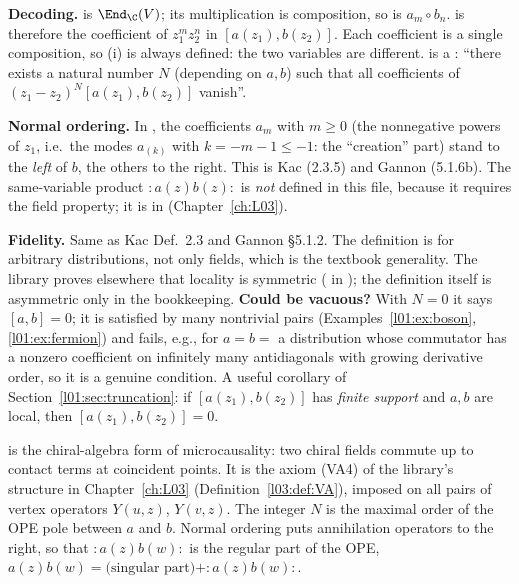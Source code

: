 \begin{dictionary}
\textbf{Decoding.}  is $\End_\C(\loneV)$; its multiplication \lean{*} is composition, so
 is $a_m\circ b_n$.  is therefore the coefficient of $z_1^mz_2^n$ in
$[a(z_1),b(z_2)]$. Each coefficient is a single composition, so (i) is always defined: the two variables are
different.  is a : ``there exists a natural number $N$ (depending on $a,b$) such that
all coefficients of $(z_1-z_2)^N[a(z_1),b(z_2)]$ vanish''.

\textbf{Normal ordering.} In , the coefficients $a_m$ with $m\ge0$ (the nonnegative powers
of $z_1$, i.e.\ the modes $a_{(k)}$ with $k = -m-1\le-1$: the ``creation'' part) stand to the \emph{left} of $b$,
the others to the right. This is Kac (2.3.5) and Gannon (5.1.6b). The same-variable product ${:}a(z)b(z){:}$ is
\emph{not} defined in this file, because it requires the field property; it is  in
 (Chapter~\ref{ch:L03}).

\textbf{Fidelity.} Same as Kac Def.~2.3 and Gannon §5.1.2. The definition is for arbitrary distributions, not
only fields, which is the textbook generality. The library proves elsewhere that locality is symmetric
( in ); the definition itself is
asymmetric only in the bookkeeping. \textbf{Could  be vacuous?} With $N = 0$ it says $[a,b] = 0$; it
is satisfied by many nontrivial pairs (Examples~\ref{l01:ex:boson}, \ref{l01:ex:fermion}) and fails, e.g., for
$a = b = $ a distribution whose commutator has a nonzero coefficient on infinitely many antidiagonals with growing
derivative order, so it is a genuine condition. A useful corollary of Section~\ref{l01:sec:truncation}: if
$[a(z_1),b(z_2)]$ has \emph{finite support} and $a,b$ are local, then $[a(z_1),b(z_2)] = 0$.
\end{dictionary}

\begin{physics}
 is the chiral-algebra form of microcausality: two chiral fields commute up to contact terms at
coincident points. It is the axiom (VA4) of the library's structure  in Chapter~\ref{ch:L03}
(Definition~\ref{l03:def:VA}), imposed on all pairs of vertex operators $Y(u,z)$, $Y(v,z)$. The integer $N$ is
the maximal order of the OPE pole between $a$ and $b$. Normal ordering puts annihilation operators to the
right, so that ${:}a(z)b(w){:}$ is the regular part of the OPE, $a(z)b(w) = \text{(singular part)} + {:}a(z)b(w){:}$.
\end{physics}

